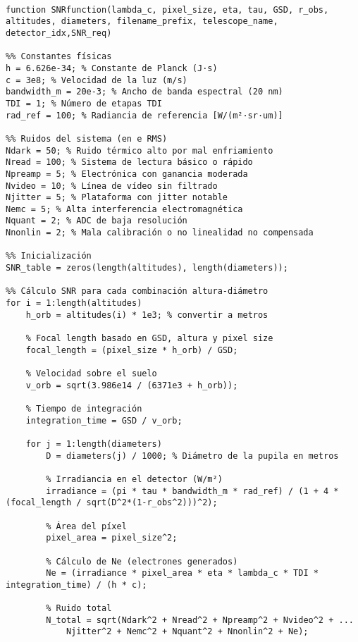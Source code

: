 \begin{verbatim}

function SNRfunction(lambda_c, pixel_size, eta, tau, GSD, r_obs, altitudes, diameters, filename_prefix, telescope_name, detector_idx,SNR_req)

%% Constantes físicas
h = 6.626e-34; % Constante de Planck (J·s)
c = 3e8; % Velocidad de la luz (m/s)
bandwidth_m = 20e-3; % Ancho de banda espectral (20 nm)
TDI = 1; % Número de etapas TDI
rad_ref = 100; % Radiancia de referencia [W/(m²·sr·um)]

%% Ruidos del sistema (en e RMS)
Ndark = 50; % Ruido térmico alto por mal enfriamiento
Nread = 100; % Sistema de lectura básico o rápido
Npreamp = 5; % Electrónica con ganancia moderada
Nvideo = 10; % Línea de vídeo sin filtrado
Njitter = 5; % Plataforma con jitter notable
Nemc = 5; % Alta interferencia electromagnética
Nquant = 2; % ADC de baja resolución
Nnonlin = 2; % Mala calibración o no linealidad no compensada

%% Inicialización
SNR_table = zeros(length(altitudes), length(diameters));

%% Cálculo SNR para cada combinación altura-diámetro
for i = 1:length(altitudes)
    h_orb = altitudes(i) * 1e3; % convertir a metros
    
    % Focal length basado en GSD, altura y pixel size
    focal_length = (pixel_size * h_orb) / GSD;
    
    % Velocidad sobre el suelo
    v_orb = sqrt(3.986e14 / (6371e3 + h_orb));
    
    % Tiempo de integración
    integration_time = GSD / v_orb;
    
    for j = 1:length(diameters)
        D = diameters(j) / 1000; % Diámetro de la pupila en metros
        
        % Irradiancia en el detector (W/m²)
        irradiance = (pi * tau * bandwidth_m * rad_ref) / (1 + 4 * (focal_length / sqrt(D^2*(1-r_obs^2)))^2);
        
        % Área del píxel
        pixel_area = pixel_size^2;
        
        % Cálculo de Ne (electrones generados)
        Ne = (irradiance * pixel_area * eta * lambda_c * TDI * integration_time) / (h * c);
        
        % Ruido total
        N_total = sqrt(Ndark^2 + Nread^2 + Npreamp^2 + Nvideo^2 + ...
            Njitter^2 + Nemc^2 + Nquant^2 + Nnonlin^2 + Ne);
        

\end{verbatim}
